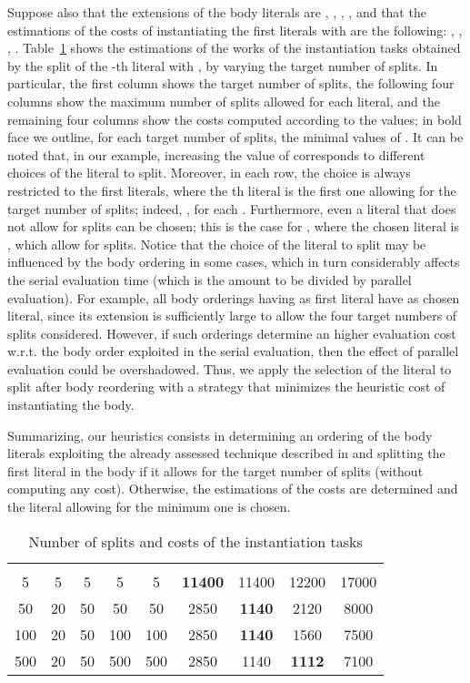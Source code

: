\documentclass[preprint]{tlp}
\begin{document}
Suppose also that the extensions of the body literals are , , , ,
and that the estimations of the costs of instantiating the first  literals with  are the following:
, , , .
Table~\ref{funValues} shows the estimations  of the works
 of the instantiation tasks obtained by the split of the -th literal
with , by varying the target number  of splits. In particular, the first column shows the target
number of splits, the following four columns show the maximum number of splits  allowed for each literal,
and the remaining four columns show the costs  computed according to the  values;
in bold face we outline, for each target number of splits, the minimal values of .
It can be noted that, in our example, increasing the value of 
corresponds to different choices of the literal to split.
Moreover, in each row, the choice is always restricted to the first  literals,
where the th literal is the first one allowing for the target number  of splits;
indeed, , for each . Furthermore, even a literal that
does not allow for  splits can be chosen; this is the case for , where the chosen
literal is , which allow for  splits.
Notice that the choice of the literal to split may be influenced by the body ordering in some cases,
which in turn considerably affects the serial evaluation time (which is the amount to be divided by parallel evaluation).
For example, all body orderings having  as first literal
have  as chosen literal, since its extension is sufficiently large to allow
the four target numbers of splits considered. However, if such orderings
determine an higher evaluation cost w.r.t. the body order exploited in the serial evaluation,
then the effect of parallel evaluation could be overshadowed.
Thus, we apply the selection of the literal to split after body reordering
with a strategy that minimizes the heuristic cost of instantiating the body.

Summarizing, our heuristics consists in determining an ordering of the body literals
exploiting the already assessed technique described in \cite{leon-etal-2001a}
and splitting the first literal in the body if it allows for the target number of splits (without computing any cost).
Otherwise, the estimations of the costs are determined and the literal allowing for the minimum one is chosen.

\begin{table}
\small
\caption{Number of splits and costs of the instantiation tasks}
\label{funValues}
\begin{tabular}{| c | c | c | c | c | c | c | c | c |}
 \cline{1-9}
 &   &   &  &    &  &   & &  \\
 \cline{1-9}
5 & 5 & 5 & 5 & 5& \bf{11400}  & 11400  & 12200 & 17000 \\
50 & 20 & 50 & 50 & 50 & 2850 & \bf{1140} & 2120 & 8000 \\
100 & 20 & 50 & 100 & 100 & 2850 &  \bf{1140} & 1560 & 7500 \\
500 & 20 & 50 & 500 & 500 & 2850  & 1140  &\bf{1112} & 7100 \\
\cline{1-9}
\end{tabular}

\end{table}
\end{document}

